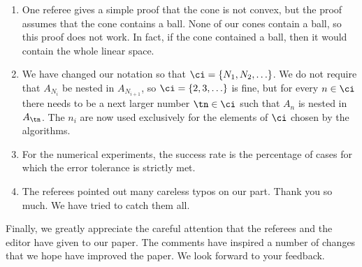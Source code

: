 \documentclass[11pt]{article}
\begin{document}
\begin{enumerate}
\item One referee gives a simple proof that the cone is not convex, but the proof assumes that the cone contains a ball.  None of our cones contain a ball, so this proof does not work.  In fact, if the cone contained a ball, then it would contain the whole linear space.

\item We have changed our notation so that $\ci=\{N_1, N_2, \ldots \}$.  We do not require that $A_{N_i}$ be nested in $A_{N_{i+1}}$, so $\ci=\{2,3, \ldots\}$ is fine, but for every $n \in \ci$ there needs to be a next larger number $\tn \in \ci$ such that $A_n$ is nested in $A_{\tn}$.  The $n_i$ are now used exclusively for the elements of $\ci$ chosen by the algorithms.

\item For the numerical experiments, the success rate is the percentage of cases for which the error tolerance is strictly met.

\item The referees pointed out many careless typos on our part.  Thank you so much.  We have tried to catch them all.

\end{enumerate}

Finally, we greatly appreciate the careful attention that the referees and the editor have given to our paper.  The comments have inspired a number of changes that we hope have improved the paper.  We look forward to your feedback.



\end{document}
